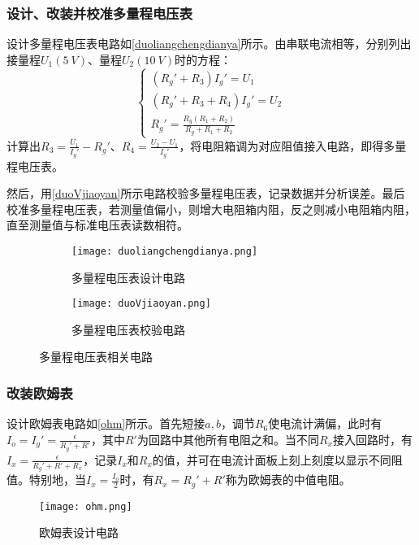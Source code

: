 \documentclass[]{../template/Report}
\begin{document}
\subsubsection{设计、改装并校准多量程电压表}
    设计多量程电压表电路如\autoref{duoliangchengdianya}所示。由串联电流相等，分别列出接量程$U_1(\SI{5}{V})$、量程$U_2(\SI{10}{V})$时的方程：
    \begin{equation}
        \begin{cases}
            (R_g'+R_3)I_g' = U_1\\
            (R_g'+R_3+R_4)I_g' = U_2\\
            R_g' = \frac{R_g(R_1+R_2)}{R_g+R_1+R_2}
        \end{cases}
    \end{equation}
    计算出$R_3=\frac{U_1}{I_g'}-R_g'$、$R_4 = \frac{U_2-U_1}{I_g'}$，将电阻箱调为对应阻值接入电路，即得多量程电压表。

    然后，用\autoref{duoVjiaoyan}所示电路校验多量程电压表，记录数据并分析误差。最后校准多量程电压表，若测量值偏小，则增大电阻箱内阻，反之则减小电阻箱内阻，直至测量值与标准电压表读数相符。
    \begin{figure}[htbp]
        \centering
        \begin{subfigure}[b]{0.45\textwidth}
            \texttt{[image: duoliangchengdianya.png]}
            \caption{多量程电压表设计电路}
            \label{duoliangchengdianya}
        \end{subfigure}
        \hfill
        \begin{subfigure}[b]{0.45\textwidth}
            \texttt{[image: duoVjiaoyan.png]}
            \caption{多量程电压表校验电路}
            \label{duoVjiaoyan}
        \end{subfigure}
        \caption{多量程电压表相关电路}
    \end{figure}

\subsubsection{改装欧姆表}
    设计欧姆表电路如\autoref{ohm}所示。首先短接$a,b$，调节$R_6$使电流计满偏，此时有$I_o = I_g' = \frac{\epsilon}{R_g'+R'}$，其中$R'$为回路中其他所有电阻之和。当不同$R_x$接入回路时，有$I_x = \frac{\epsilon}{R_g'+R'+R_x}$，记录$I_x$和$R_x$的值，并可在电流计面板上刻上刻度以显示不同阻值。特别地，当$I_x=\frac{I_o}{2}$时，有$R_x = R_g' + R'$称为欧姆表的中值电阻。
    \begin{figure}[htbp]
        \centering
        \texttt{[image: ohm.png]}
        \caption{欧姆表设计电路}
        \label{ohm}
    \end{figure}
\end{document}
